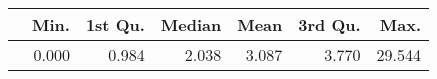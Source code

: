 \begin{table}[ht]
\centering
\begin{tabular}{rrrrrrr}
  \hline
 & Min. & 1st Qu. & Median & Mean & 3rd Qu. & Max. \\ 
  \hline
 & 0.000 & 0.984 & 2.038 & 3.087 & 3.770 & 29.544 \\ 
   \hline
\end{tabular}
\end{table}
